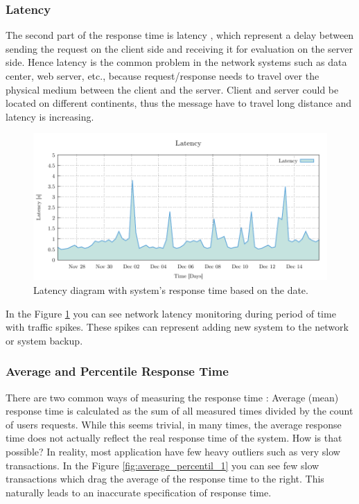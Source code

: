\subsubsection*{Latency}
The second part of the response time is latency \cite{Broadwell:RPT, BHATT:PERF}, which represent a delay between sending the request on the client side and receiving it for evaluation on the server side. Hence latency is the common problem in the network systems such as data center, web server, etc., because request/response needs to travel over the physical medium between the client and the server. Client and server could be located on different continents, thus the message have to travel long distance and latency is increasing.

\begin{figure}[H]
  \centering
  \includegraphics[width=15cm]{obrazky-figures/latency.pdf}
  \caption{Latency diagram with system's response time based on the date.}
  \label{fig:latency}
\end{figure}

In the Figure \ref{fig:latency} you can see network latency monitoring during period of time with traffic spikes. These spikes can represent adding new system to the network or system backup.

\subsubsection*{Average and Percentile Response Time}
There are two common ways of measuring the response time \cite{Kopp:RPT}: Average (mean) response time is calculated as the sum of all measured times divided by the count of users requests. While this seems trivial, in many times, the average response time does not actually reflect the real response time of the system. How is that possible? In reality, most application have few heavy outliers such as very slow transactions. In the Figure \ref{fig:average_percentil_1} you can see few slow transactions which drag the average of the response time to the right. This naturally leads to an inaccurate specification of response time.


